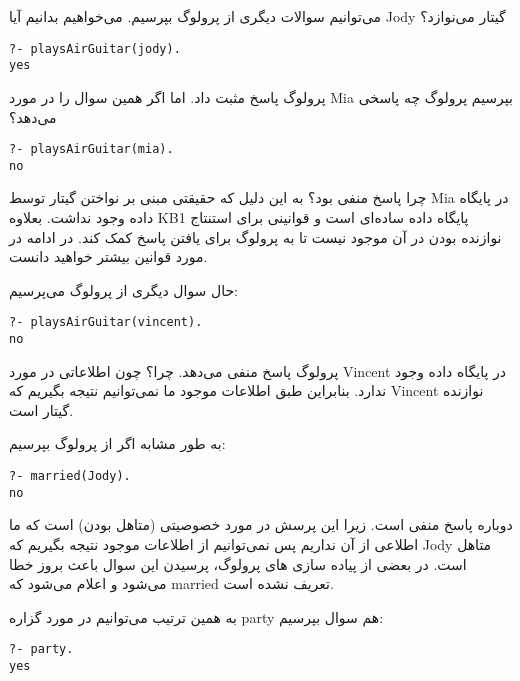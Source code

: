 می‌توانیم سوالات دیگری از ‌‌پرولوگ بپرسیم. می‌خواهیم بدانیم آیا Jody گیتار می‌نوازد؟

\begin{latin}
\begin{lstlisting}
?- playsAirGuitar(jody).
yes
\end{lstlisting}
\end{latin}

پرولوگ پاسخ مثبت داد. اما اگر همین سوال را در مورد Mia بپرسیم پرولوگ چه پاسخی می‌دهد؟

\begin{latin}
\begin{lstlisting}
?- playsAirGuitar(mia).
no
\end{lstlisting}
\end{latin}

چرا پاسخ منفی بود؟ به این دلیل که حقیقتی مبنی بر نواختن گیتار توسط Mia در پایگاه داده وجود نداشت. بعلاوه KB1 پایگاه داده ساده‌ای است و قوانینی برای استنتاج نوازنده بودن در آن موجود نیست تا به پرولوگ برای یافتن پاسخ کمک کند. در ادامه در مورد قوانین بیشتر خواهید دانست.

حال سوال دیگری از پرولوگ می‌پرسیم:

\begin{latin}
\begin{lstlisting}
?- playsAirGuitar(vincent).
no
\end{lstlisting}
\end{latin}

پرولوگ پاسخ منفی می‌دهد. چرا؟ چون اطلاعاتی در مورد Vincent در پایگاه داده وجود ندارد. بنابراین طبق اطلاعات موجود ما نمی‌توانیم نتیجه بگیریم که Vincent نوازنده گیتار است.

به طور مشابه اگر از پرولوگ بپرسیم:

\begin{latin}
\begin{lstlisting}
?- married(Jody).
no
\end{lstlisting}
\end{latin}

دوباره پاسخ منفی است. زیرا این پرسش در مورد خصوصیتی (متاهل بودن) است که ما اطلاعی از آن نداریم پس نمی‌توانیم از اطلاعات موجود نتیجه بگیریم که Jody متاهل است. در بعضی از پیاده سازی های پرولوگ، پرسیدن این سوال باعث بروز خطا می‌شود و اعلام می‌شود که married تعریف نشده است.

به همین ترتیب می‌توانیم در مورد گزاره party هم سوال بپرسیم:

\begin{latin}
\begin{lstlisting}
?- party.
yes
\end{lstlisting}
\end{latin}

